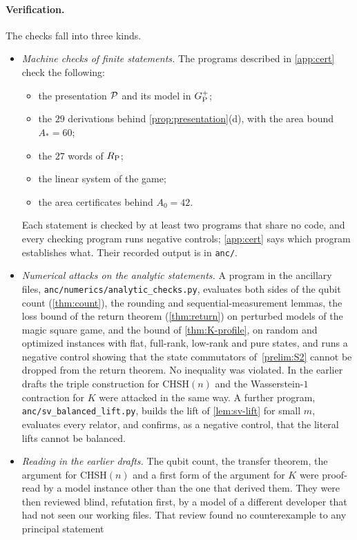 \paragraph{Verification.} The checks fall into three kinds.
\begin{itemize}[itemsep=1pt]
\item \emph{Machine checks of finite statements.} The programs described in \cref{app:cert} check the following:
\begin{itemize}[itemsep=0pt]
\item the presentation $\mathcal P$ and its model in $G_{\mathrm P}^{+}$;
\item the $29$ derivations behind \cref{prop:presentation}(d), with the area bound $A_*=60$;
\item the $27$ words of $R_{\mathrm P}$;
\item the linear system of the game;
\item the area certificates behind $A_0=42$.
\end{itemize}
Each statement is checked by at least two programs that share no code, and every checking program runs negative
controls; \cref{app:cert} says which program establishes what. Their recorded output is in \texttt{anc/}.
\item \emph{Numerical attacks on the analytic statements.} A program in the ancillary files,
\texttt{anc/numerics/analytic\_checks.py}, evaluates both sides of the qubit count (\cref{thm:count}), the rounding and sequential-measurement lemmas, the loss bound of the return theorem (\cref{thm:return}) on
perturbed models of the magic square game, and the bound of \cref{thm:K-profile}, on random and optimized instances with flat, full-rank,
low-rank and pure states, and runs a negative control showing that the state commutators of~\ref{prelim:S2} cannot be dropped from the return
theorem. No inequality was violated. In the earlier drafts the triple construction for CHSH$(n)$ and the Wasserstein-$1$ contraction for
$K$ were attacked in the same way. A further program, \texttt{anc/sv\_balanced\_lift.py}, builds the lift of \cref{lem:sv-lift} for small
$m$, evaluates every relator, and confirms, as a negative control, that the literal lifts cannot be balanced.
\item \emph{Reading in the earlier drafts.} The qubit count, the transfer theorem, the argument for CHSH$(n)$ and a first form of the
argument for $K$ were proof-read by a model instance other than the one that derived them. They were then reviewed blind, refutation first,
by a model of a different developer that had not seen our working files. That review found no counterexample to any principal statement

\end{itemize}
